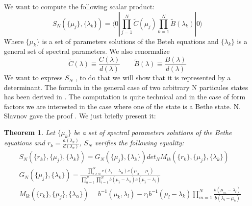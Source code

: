 \documentclass[12pt]{article}
\newtheorem{theo}{Theorem}[section]
\begin{document}
We want to compute the following scalar product:
\begin{equation}
S_{N}(\{\mu_{j}\},\{\lambda_{k}\})=\langle 0|\prod_{j=1}^{N}\widetilde{C}(\mu_{j})\prod_{k=1}^{N}\widetilde{B}(\lambda_{k})|0\rangle
\end{equation}
 Where $\{\mu_{k}\}$ is a set of parameters solutions of the Beteh equations and $\{\lambda_{k}\}$ is a general set of spectral parameters.  %
  We also renormalize $$\widetilde{C}(\lambda)\equiv\frac{C(\lambda)}{d(\lambda)}\qquad \widetilde{B}(\lambda)\equiv\frac{B(\lambda)}{d(\lambda)}$$
 We want to express $S_{N}$ , to do that we will show that it is represented by a determinant. The formula in the general case of two arbitrary N particules states has been derived in \cite{BogIK93L}. The computation is quite technical and in the case of form factors we are interested in the case where one of the state is a Bethe state. N. Slavnov gave the proof \cite{Sla89}. We just briefly present it:
\begin{theo}
  Let $\{\mu_{k}\}$ be a set of spectral parameters solutions of the Bethe equations and $r_k=\frac{a(\lambda_k)}{d(\lambda_k)}$, $S_N$ %
  verifies the following equality:
\begin{align}
&S_{N}(\{r_k\},\{\mu_{j}\},\{\lambda_{k}\})=G_{N}(\{\mu_j\},\{\lambda_k\})det_{N}M_{lk}(\{r_k\},\{\mu_j\},\{\lambda_k\})\\
&G_{N}(\{\mu_j\},\{\lambda_k\})=\frac{\prod_{i>\alpha}^{N}c(\lambda_{i}-\lambda_{\alpha})c(\mu_{\alpha}-\mu_i)}{\prod_{\alpha=1}^{N}\prod_{i=1}^{N}b(\mu_{i}-\lambda_{\alpha})c(\mu_i-\lambda_i)}\\
&M_{lk}(\{r_k\},\{\mu_j\},\{\lambda_{\alpha}\})=b^{-1}(\mu_k,\lambda_l)-r_l b^{-1}(\mu_l-\lambda_k)\prod_{m=1}^{N}\frac{b(\mu_m-\lambda_l)}{b(\lambda_l-\mu_k)}
\end{align}
\end{theo}
 
 
 
 


 
 
\end{document}
